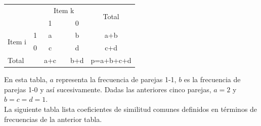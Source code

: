 \documentclass[a4paper, 20pt]{article}
\begin{document}
\begin{table}[h]
\centering
\resizebox{7cm}{!} {
\begin{tabular}{ll|clc|c|l}
\multicolumn{2}{l|}{\multirow{2}{*}{}} & \multicolumn{3}{c}{Item k} & \multicolumn{2}{c|}{\multirow{2}{*}{Total}} \\
\multicolumn{2}{l|}{}                  & 1        &       & 0       & \multicolumn{2}{c|}{}                        \\ \hline
\multirow{2}{*}{Item i}       & 1      & a        &       & b       & \multicolumn{2}{c|}{a+b}                     \\
                              & 0      & c        &       & d       & \multicolumn{2}{c|}{c+d}                     \\ \hline
\multicolumn{2}{l|}{Total}            & a+c      &       & b+d     & \multicolumn{2}{c|}{p=a+b+c+d}              
\end{tabular}
}
\end{table}

En esta tabla, $a$ representa la frecuencia de parejas 1-1, $b$ es la frecuencia de parejas 1-0 y así sucesivamente. Dadas las anteriores cinco parejas, $a=2$ y $b=c=d=1$.\\

La siguiente tabla lista coeficientes de similitud comunes definidos en términos de frecuencias de la anterior tabla.

\clearpage
\end{document}
